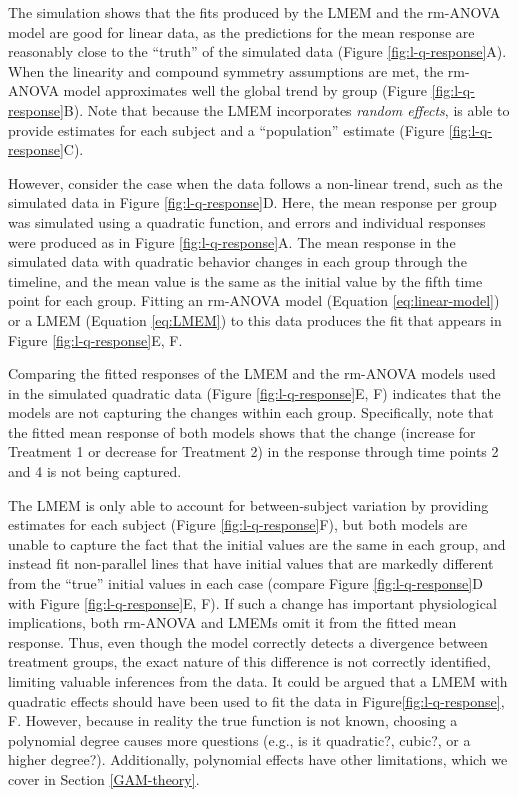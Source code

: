 \documentclass[
]{article}
\begin{document}
The simulation shows that the fits produced by the LMEM and the rm-ANOVA model are good for linear data, as the predictions for the mean response are reasonably close to the ``truth'' of the simulated data (Figure \ref{fig:l-q-response}A). When the linearity and compound symmetry assumptions are met, the rm-ANOVA model approximates well the global trend by group (Figure \ref{fig:l-q-response}B). Note that because the LMEM incorporates \emph{random effects}, is able to provide estimates for each subject and a ``population'' estimate (Figure \ref{fig:l-q-response}C).

However, consider the case when the data follows a non-linear trend, such as the simulated data in Figure \ref{fig:l-q-response}D. Here, the mean response per group was simulated using a quadratic function, and errors and individual responses were produced as in Figure \ref{fig:l-q-response}A. The mean response in the simulated data with quadratic behavior changes in each group through the timeline, and the mean value is the same as the initial value by the fifth time point for each group. Fitting an rm-ANOVA model (Equation \eqref{eq:linear-model}) or a LMEM (Equation \eqref{eq:LMEM}) to this data produces the fit that appears in Figure \ref{fig:l-q-response}E, F.

Comparing the fitted responses of the LMEM and the rm-ANOVA models used in the simulated quadratic data (Figure \ref{fig:l-q-response}E, F) indicates that the models are not capturing the changes within each group. Specifically, note that the fitted mean response of both models shows that the change (increase for Treatment 1 or decrease for Treatment 2) in the response through time points 2 and 4 is not being captured.

The LMEM is only able to account for between-subject variation by providing estimates for each subject (Figure \ref{fig:l-q-response}F), but both models are unable to capture the fact that the initial values are the same in each group, and instead fit non-parallel lines that have initial values that are markedly different from the ``true'' initial values in each case (compare Figure \ref{fig:l-q-response}D with Figure \ref{fig:l-q-response}E, F). If such a change has important physiological implications, both rm-ANOVA and LMEMs omit it from the fitted mean response. Thus, even though the model correctly detects a divergence between treatment groups, the exact nature of this difference is not correctly identified, limiting valuable inferences from the data. It could be argued that a LMEM with quadratic effects should have been used to fit the data in Figure\ref{fig:l-q-response}, F. However, because in reality the true function is not known, choosing a polynomial degree causes more questions (e.g., is it quadratic?, cubic?, or a higher degree?). Additionally, polynomial effects have other limitations, which we cover in Section \ref{GAM-theory}.
\end{document}
